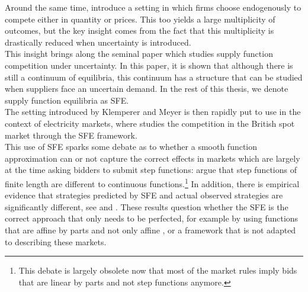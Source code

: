 Around the same time, \cite{klemperer1986price} introduce a setting in which firms choose endogenously to compete either in quantity or prices. This too yields a large multiplicity of outcomes, but the key insight comes from the fact that this multiplicity is drastically reduced when uncertainty is introduced.\\

This insight brings along the seminal paper \cite{KM} which studies supply function competition under uncertainty. In this paper, it is shown that although there is still a continuum of equilibria, this continuum has a structure that can be studied when suppliers face an uncertain demand. In the rest of this thesis, we denote supply function equilibria as SFE. \\

The setting introduced by Klemperer and Meyer is then rapidly put to use in the context of electricity markets, where \cite{Newgreen} studies the competition in the British spot market through the SFE framework. \\

This use of SFE sparks some debate as to whether a smooth function approximation can or not capture the correct effects in markets which are largely at the time asking bidders to submit step functions: \cite{von1993spot} argue that step functions of finite length are different to continuous functions.\footnote{This debate is largely obsolete now that most of the market rules imply bids that are linear by parts and not step functions anymore.} In addition, there is empirical evidence that strategies predicted by SFE and actual observed strategies are significantly different, see \cite{willems2009cournot} and \cite{willems2009cournot}. These results question whether the SFE is the correct approach that only needs to be perfected, for example by using functions that are affine by parts and not only affine \cite{baldick2004theory}, or a framework that is not adapted to describing these markets.\\

